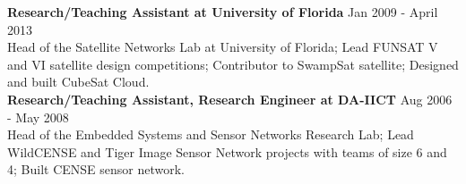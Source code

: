 \begin{resume}
\textbf{Research/Teaching Assistant at University of Florida} \hfill Jan 2009 - April 2013\\
Head of the Satellite Networks Lab at University of Florida; Lead FUNSAT V and VI satellite design competitions; Contributor to SwampSat satellite; Designed and built CubeSat Cloud.\\
\textbf{Research/Teaching Assistant, Research Engineer at DA-IICT} \hfill Aug 2006 - May 2008 \\
Head of the Embedded Systems and Sensor Networks Research Lab; Lead WildCENSE and Tiger Image Sensor Network projects with teams of size 6 and 4; Built CENSE sensor network.

\begin{formatb}
  \\
  \body\\
\end{formatb}


\end{resume}
